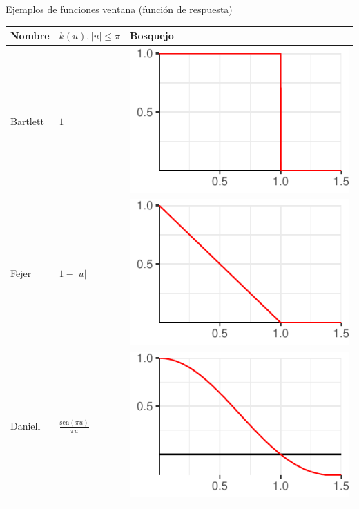 \documentclass[12pt,letterpaper]{book}
\newcommand{\SEN}[1]{\mathrm{sen}\left( #1 \right)}
\newcommand{\abso}[1]{\left| #1 \right|}
\begin{document}
\begin{SidewaysTable}
\caption{Ejemplos de funciones ventana (función de respuesta)}
\centering
\begin{tabular*}{\textwidth}{lll}
\toprule
Nombre & $k(u), \abso{u} \leq \pi$ & Bosquejo \\
\midrule
Bartlett &
$\displaystyle 
1 
$
& \includegraphics[scale=.4]{./img_ventanas/ventana_bartlett.pdf}\\
\rowcolor{gris}
Fejer &
$\displaystyle 
1-\abso{u}
$
& \includegraphics[scale=.4]{./img_ventanas/ventana_fejer.pdf} \\
Daniell &
$\displaystyle 
\frac{\SEN{\pi u}}{\pi u}
$
& \includegraphics[scale=.4]{./img_ventanas/ventana_daniell.pdf} \\

\end{tabular*}
\end{SidewaysTable}
\end{document}
